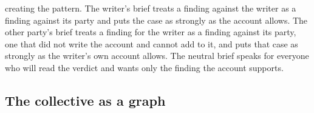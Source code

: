 creating the pattern. %
The writer's brief treats a finding against the writer as a finding
against its party and puts the case as strongly as the account allows. The
other party's brief treats a finding for the writer as a finding against
its party, one that did not write the account and cannot add to it, and
puts that case as strongly as the writer's own account allows. The
neutral brief speaks for everyone who will read the verdict and wants only
the finding the account supports. %

\subsection{The collective as a graph}
\label{sec-method-collective}


